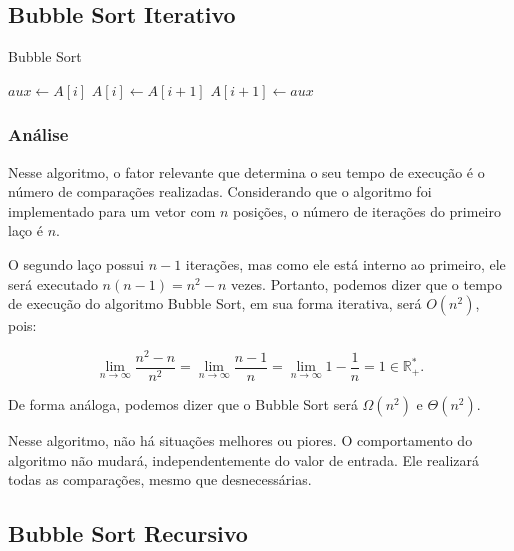 \FloatBarrier

\newpage

\subsection{Bubble Sort Iterativo}

\begin{algorithm}
	\caption{Bubble Sort}
	\label{algo:bubble_sort_it}
	\begin{algorithmic}[1]
		\Statex
		\State $aux \gets A[i]$
		\State $A[i] \gets A[i + 1]$
		\State $A[i + 1] \gets aux$
		\EndIf
		\EndFor
		\EndFor
		\EndFunction
	\end{algorithmic}
\end{algorithm}

\subsubsection{Análise}
Nesse algoritmo, o fator relevante que determina o seu tempo de execução é o número de comparações realizadas. Considerando que o algoritmo foi implementado para um vetor com \( n \) posições, o número de iterações do primeiro laço é \( n \).

O segundo laço possui \( n-1 \) iterações, mas como ele está interno ao primeiro, ele será executado \( n(n-1) = n^2 - n \) vezes. Portanto, podemos dizer que o tempo de execução do algoritmo Bubble Sort, em sua forma iterativa, será \( O(n^2) \), pois:

\[
	\lim_{n \rightarrow \infty} \frac{n^2 - n}{n^2} =
	\lim_{n \rightarrow \infty} \frac{n - 1}{n} =
	\lim_{n \rightarrow \infty} 1-\frac{1}{n} =
	1 \in \mathbb{R}^*_+.
\]

De forma análoga, podemos dizer que o Bubble Sort será \( \Omega(n^2) \) e \( \Theta(n^2) \).

Nesse algoritmo, não há situações melhores ou piores. O comportamento do algoritmo não mudará, independentemente do valor de entrada. Ele realizará todas as comparações, mesmo que desnecessárias.

\newpage

\subsection{Bubble Sort Recursivo}

